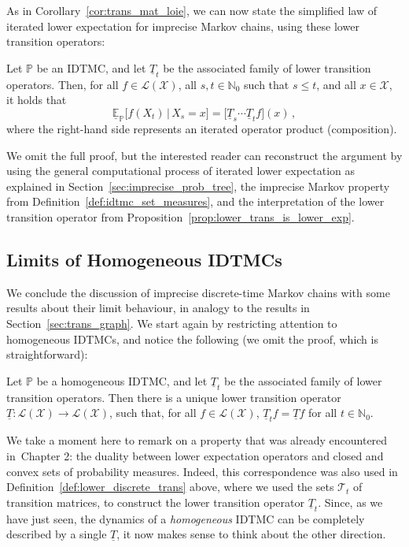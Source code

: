 \documentclass[graybox]{svmult}
\newcommand{\nats}{\mathbb{N}}
\newcommand{\natswith}{\nats_{0}}
\newcommand{\states}{\mathcal{X}}
\newcommand{\gambles}{\mathcal{L}}
\newcommand{\gamblesX}{\gambles(\states)}
\def\refIPChapter{Chapter 2}
\begin{document}
As in Corollary~\ref{cor:trans_mat_loie}, we can now state the simplified law of iterated lower expectation for imprecise Markov chains, using these lower transition operators:
\begin{theorem}\label{thm:loile_dt}
Let $\mathbb{P}$ be an IDTMC, and let $\underline{T}_t$ be the associated family of lower transition operators. Then, for all $f\in\gamblesX$, all $s,t\in\natswith$ such that $s\leq t$, and all $x\in\states$, it holds that
\begin{equation*}
\underline{\mathbb{E}}_\mathbb{P}\bigl[f(X_t)\,\big\vert\,X_s=x\bigr] = \bigl[\underline{T}_s\cdots \underline{T}_tf\bigr](x)\,,
\end{equation*}
where the right-hand side represents an iterated operator product (composition). 
\end{theorem}
We omit the full proof, but the interested reader can reconstruct the argument by using the general computational process of iterated lower expectation as explained in Section~\ref{sec:imprecise_prob_tree}, the imprecise Markov property from Definition~\ref{def:idtmc_set_measures}, and the interpretation of the lower transition operator from Proposition~\ref{prop:lower_trans_is_lower_exp}.

\subsection{Limits of Homogeneous IDTMCs}

We conclude the discussion of imprecise discrete-time Markov chains with some results about their limit behaviour, in analogy to the results in Section~\ref{sec:trans_graph}. We start again by restricting attention to homogeneous IDTMCs, and notice the following (we omit the proof, which is straightforward):
\begin{proposition}
Let $\mathbb{P}$ be a homogeneous IDTMC, and let $\underline{T}_t$ be the associated family of lower transition operators. Then there is a unique lower transition operator $\underline{T}:\gamblesX\to\gamblesX$, such that, for all $f\in\gamblesX$, $\underline{T}_tf=\underline{T}f$ for all $t\in\natswith$.
\end{proposition}

We take a moment here to remark on a property that was already encountered in~\refIPChapter: the duality between lower expectation operators and closed and convex sets of probability measures. Indeed, this correspondence was also used in Definition~\ref{def:lower_discrete_trans} above, where we used the sets $\mathcal{T}_t$ of transition matrices, to construct the lower transition operator $\underline{T}_t$. Since, as we have just seen, the dynamics of a \emph{homogeneous} IDTMC can be completely described by a single $\underline{T}$, it now makes sense to think about the other direction. 
\end{document}

